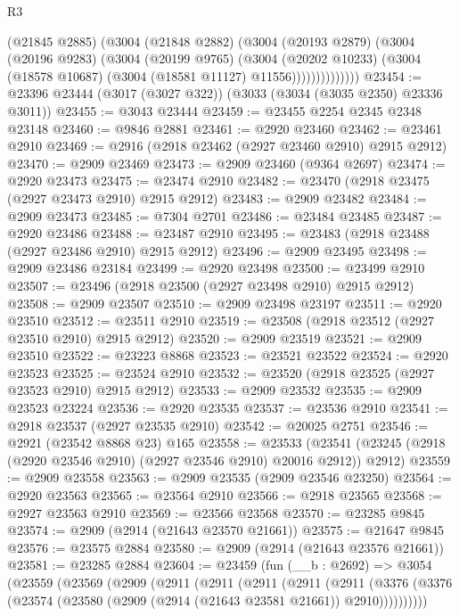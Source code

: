 \begin{lexlean}{R3}
\begin{coremodule}
                  (@21845 @2885)
                  (@3004
                    (@21848 @2882)
                    (@3004
                      (@20193 @2879)
                      (@3004
                        (@20196 @9283)
                        (@3004
                          (@20199 @9765)
                          (@3004
                            (@20202 @10233)
                            (@3004 (@18578 @10687) (@3004 (@18581 @11127) @11556))))))))))))))
@23454 := @23396 @23444 (@3017 (@3027 @322)) (@3033 (@3034 (@3035 @2350) @23336 @3011))
@23455 := @3043 @23444
@23459 := @23455 @2254 @2345 @2348 @23148
@23460 := @9846 @2881
@23461 := @2920 @23460
@23462 := @23461 @2910
@23469 := @2916 (@2918 @23462 (@2927 @23460 @2910) @2915 @2912)
@23470 := @2909 @23469
@23473 := @2909 @23460 (@9364 @2697)
@23474 := @2920 @23473
@23475 := @23474 @2910
@23482 := @23470 (@2918 @23475 (@2927 @23473 @2910) @2915 @2912)
@23483 := @2909 @23482
@23484 := @2909 @23473
@23485 := @7304 @2701
@23486 := @23484 @23485
@23487 := @2920 @23486
@23488 := @23487 @2910
@23495 := @23483 (@2918 @23488 (@2927 @23486 @2910) @2915 @2912)
@23496 := @2909 @23495
@23498 := @2909 @23486 @23184
@23499 := @2920 @23498
@23500 := @23499 @2910
@23507 := @23496 (@2918 @23500 (@2927 @23498 @2910) @2915 @2912)
@23508 := @2909 @23507
@23510 := @2909 @23498 @23197
@23511 := @2920 @23510
@23512 := @23511 @2910
@23519 := @23508 (@2918 @23512 (@2927 @23510 @2910) @2915 @2912)
@23520 := @2909 @23519
@23521 := @2909 @23510
@23522 := @23223 @8868
@23523 := @23521 @23522
@23524 := @2920 @23523
@23525 := @23524 @2910
@23532 := @23520 (@2918 @23525 (@2927 @23523 @2910) @2915 @2912)
@23533 := @2909 @23532
@23535 := @2909 @23523 @23224
@23536 := @2920 @23535
@23537 := @23536 @2910
@23541 := @2918 @23537 (@2927 @23535 @2910)
@23542 := @20025 @2751
@23546 := @2921 (@23542 @8868 @23) @165
@23558 := @23533
    (@23541 (@23245 (@2918 (@2920 @23546 @2910) (@2927 @23546 @2910) @20016 @2912)) @2912)
@23559 := @2909 @23558
@23563 := @2909 @23535 (@2909 @23546 @23250)
@23564 := @2920 @23563
@23565 := @23564 @2910
@23566 := @2918 @23565
@23568 := @2927 @23563 @2910
@23569 := @23566 @23568
@23570 := @23285 @9845
@23574 := @2909 (@2914 (@21643 @23570 @21661))
@23575 := @21647 @9845
@23576 := @23575 @2884
@23580 := @2909 (@2914 (@21643 @23576 @21661))
@23581 := @23285 @2884
@23604 := @23459
    (fun (__b : @2692) =>
    @3054
      (@23559
        (@23569
          (@2909
            (@2911
              (@2911
                (@2911
                  (@2911
                    (@2911
                      (@3376
                        (@3376 (@23574 (@23580 (@2909 (@2914 (@21643 @23581 @21661)) @2910))))))))))

\end{coremodule}
\end{lexlean}
